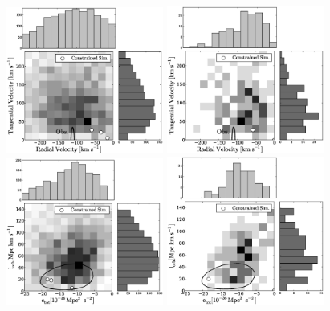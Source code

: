 \documentclass{emulateapj}
\begin{document}
\begin{figure}
\begin{center}
\includegraphics[keepaspectratio=true,width=0.46\textwidth]{fig_1a.eps}
\includegraphics[keepaspectratio=true,width=0.46\textwidth]{fig_1b.eps}
\includegraphics[keepaspectratio=true,width=0.46\textwidth]{fig_1c.eps}
\includegraphics[keepaspectratio=true,width=0.46\textwidth]{fig_1d.eps}

\end{center}
\end{figure}
\end{document}
